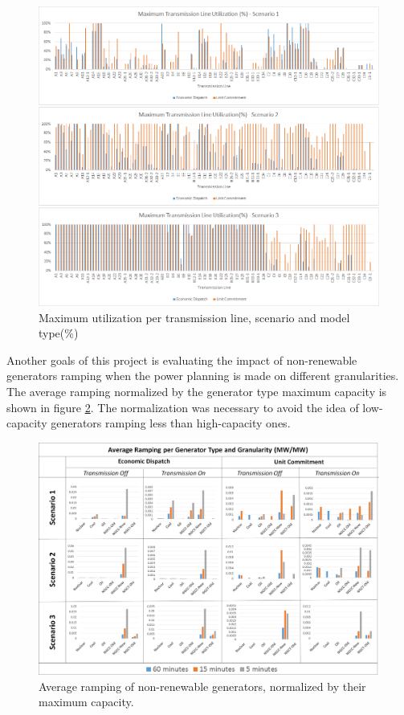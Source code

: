 \documentclass[12pt,LUDisStyle,twosided]{book}
\begin{document}
\begin{figure}[!h] 
  \centering
  
	  \includegraphics[width=\textwidth,height=\textheight,keepaspectratio]{MaximumTransmissionLineUtilization.png}
  
  \caption{Maximum utilization per transmission line, scenario and model type(\%)}
  \label{fig:maximumutilizaton}
\end{figure}

Another goals of this project is evaluating the impact of non-renewable generators ramping when the power planning is made on different granularities. The average ramping normalized by the generator type maximum capacity is shown in figure  \ref{fig:averageramping}. The normalization was necessary to avoid the idea of low-capacity generators ramping less than high-capacity ones.

\begin{figure}[!h] 
  \centering
  
	  \includegraphics[width=\textwidth,height=\textheight,keepaspectratio]{averageRamping.png}
  
  \caption{Average ramping of non-renewable generators, normalized by their maximum capacity.}
  \label{fig:averageramping}
  
\end{figure}
\end{document}
